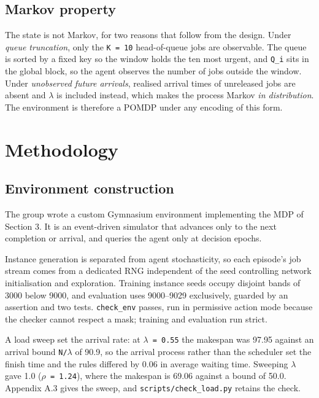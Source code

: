 \subsection{Markov property}\label{does-the-markov-property-hold}

The state is not Markov, for two reasons that follow from the design. Under \emph{queue truncation}, only the
\texttt{K\ =\ 10} head-of-queue jobs are observable. The queue is sorted by a fixed key so the window holds
the ten most urgent, and \texttt{\textbar{}Q\_i\textbar{}} sits in the global block, so the agent observes the number of jobs
outside the window. Under \emph{unobserved future arrivals}, realised arrival times of unreleased jobs are absent
and \texttt{$\lambda$} is included instead, which makes the process Markov \emph{in distribution}. The environment is therefore a POMDP
under any encoding of this form.

\section{Methodology}\label{methodology}

\subsection{Environment construction}\label{environment-construction}

The group wrote a custom Gymnasium \citep{towers2023gymnasium} environment implementing the MDP of
Section 3. It is an event-driven simulator that advances only to the next completion or arrival,
and queries the agent only at decision epochs.

Instance generation is separated from agent stochasticity, so each episode's job stream comes from a
dedicated RNG independent of the seed controlling network initialisation and exploration. Training
instance seeds occupy disjoint bands of 3000 below 9000, and evaluation uses 9000--9029 exclusively,
guarded by an assertion and two tests. \texttt{check\_env} passes, run in permissive action mode because the
checker cannot respect a mask; training and evaluation run strict.

A load sweep set the arrival rate: at \texttt{$\lambda$\ =\ 0.55} the makespan was 97.95 against an arrival bound \texttt{N/$\lambda$} of 90.9, so the arrival process rather than the scheduler
set the finish time and the rules differed by 0.06 in average waiting time. Sweeping \texttt{$\lambda$} gave 1.0 (\texttt{$\rho$\ =\ 1.24}), where
the makespan is 69.06 against a bound of 50.0. Appendix A.3 gives the sweep, and
\texttt{scripts/check\_load.py} retains the check.

